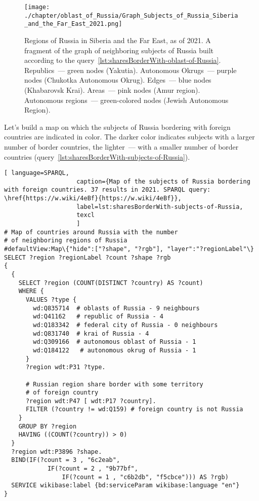 \begin{figure*}[h]
	\texttt{[image: ./chapter/oblast\_of\_Russia/Graph\_Subjects\_of\_Russia\_Siberia\_and\_the\_Far\_East\_2021.png]}
	\caption[Graph of the subjects of Russia. Kaliningrad, 2021.]{Regions of Russia in Siberia and the Far East, as of 2021. A fragment of the graph of neighboring subjects of Russia built according to the query~\protect\ref{lst:sharesBorderWith-oblast-of-Russia}.
	Republics~--- green nodes (Yakutia).
	Autonomous Okrugs~--- purple nodes (Chukotka Autonomous Okrug).
	Edges~--- blue nodes (Khabarovsk Krai).
	Areas~--- pink nodes (Amur region).
	Autonomous regions~--- green-colored nodes (Jewish Autonomous Region).}%
      \label{fig:sharesBorderWith-oblast-of-Russia-Kaliningrad-fig}%
\end{figure*}

\newpage
Let's build a map on which the subjects of Russia bordering with foreign countries are indicated in color. The darker color indicates subjects with a larger number of border countries, the lighter~--- with a smaller number of border countries (query~\ref{lst:sharesBorderWith-subjects-of-Russia}).

\lstset{numbers=left, firstnumber=1, frame=single}
\begin{lstlisting}[ language=SPARQL, 
                    caption={Map of the subjects of Russia bordering with foreign countries. 37 results in 2021. SPARQL query: \href{https://w.wiki/4eBf}{https://w.wiki/4eBf}},
                    label=lst:sharesBorderWith-subjects-of-Russia,
                    texcl 
                    ]
# Map of countries around Russia with the number 
# of neighboring regions of Russia
#defaultView:Map\{"hide":["?shape", "?rgb"], "layer":"?regionLabel"\}
SELECT ?region ?regionLabel ?count ?shape ?rgb
{
  {
    SELECT ?region (COUNT(DISTINCT ?country) AS ?count)
    WHERE {
      VALUES ?type {
        wd:Q835714  # oblasts of Russia - 9 neighbours
        wd:Q41162   # republic of Russia - 4
        wd:Q183342  # federal city of Russia - 0 neighbours
        wd:Q831740  # krai of Russia - 4
        wd:Q309166  # autonomous oblast of Russia - 1
        wd:Q184122   # autonomous okrug of Russia - 1
      }
      ?region wdt:P31 ?type.
  
      # Russian region share border with some territory 
      # of foreign country
      ?region wdt:P47 [ wdt:P17 ?country].
      FILTER (?country != wd:Q159) # foreign country is not Russia
    }
    GROUP BY ?region
    HAVING ((COUNT(?country)) > 0)
  }
  ?region wdt:P3896 ?shape.
  BIND(IF(?count = 3 , "6c2eab", 
            IF(?count = 2 , "9b77bf", 
                IF(?count = 1 , "c6b2db", "f5cbce"))) AS ?rgb)
  SERVICE wikibase:label {bd:serviceParam wikibase:language "en"}  
}
\end{lstlisting}%

